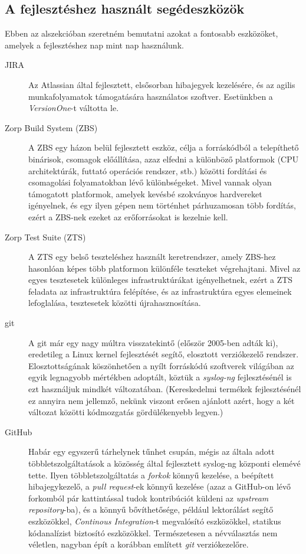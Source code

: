 \subsection{A fejlesztéshez használt segédeszközök}

Ebben az alszekcióban szeretném bemutatni azokat a fontosabb eszközöket, amelyek a fejlesztéshez nap
mint nap használunk.

\begin{description}
    \item[JIRA] {Az Atlassian által fejlesztett, elsősorban hibajegyek kezelésére, és az agilis
        munkafolyamatok támogatására használatos szoftver. Esetünkben a \emph{VersionOne}-t váltotta
        le.}
    \item[Zorp Build System (ZBS)] {A ZBS egy házon belül fejlesztett eszköz, célja a forráskódból
        a telepíthető binárisok, csomagok előállítása, azaz elfedni a különböző platformok (CPU
        architektúrák, futtató operációs rendszer, stb.) közötti fordítási és csomagolási
        folyamatokban lévő különbségeket. Mivel vannak olyan támogatott platformok, amelyek
        kevésbé szokványos hardvereket igényelnek, és egy ilyen gépen nem történhet párhuzamosan
        több fordítás, ezért a ZBS-nek ezeket az erőforrásokat is kezelnie kell. }
    \item[Zorp Test Suite (ZTS)] { A ZTS egy belső teszteléshez használt keretrendszer, amely
        ZBS-hez hasonlóan képes több platformon különféle teszteket végrehajtani. Mivel az egyes
        tesztesetek különleges infrastruktúrákat igényelhetnek, ezért a ZTS feladata az
        infrastruktúra felépítése, és az infrastruktúra egyes elemeinek lefoglalása, tesztesetek
        közötti újrahasznosítása.}
    \item[git] {A git már egy nagy múltra visszatekintő (először 2005-ben adták ki), eredetileg a
        Linux kernel fejlesztését segítő, elosztott verziókezelő rendszer. Elosztottságának
        köszönhetően a nyílt forráskódú szoftverek világában az egyik legnagyobb mértékben
        adoptált, köztük a \emph{syslog-ng} fejlesztésénél is ezt használjuk mindkét változatában.
        (Kereskedelmi termékek fejlesztésénél ez annyira nem jellemző, nekünk viszont erősen
        ajánlott azért, hogy a két változat közötti kódmozgatás gördülékenyebb legyen.)}
    \item[GitHub] {Habár egy egyszerű tárhelynek tűnhet csupán, mégis az általa adott
        többletszolgáltatások a közösség által fejlesztett syslog-ng központi elemévé tette.
        Ilyen többletszolgáltatás a \emph{forkok} könnyű kezelése, a beépített hibajegykezelő,
        a \emph{pull request}-ek könnyű kezelése (azaz a GitHub-on lévő forkomból pár
        kattintással tudok kontribúciót küldeni az \emph{upstream repository}-ba), és a könnyű
        bővíthetősége, például lektorálást segítő eszközökkel, \emph{Continous Integration}-t
        megvalósító eszközökkel, statikus kódanalízist biztosító eszközökkel.
        Természetesen a névválasztás nem véletlen, nagyban épít a korábban említett \emph{git}
        verziókezelőre.}
\end{description}

